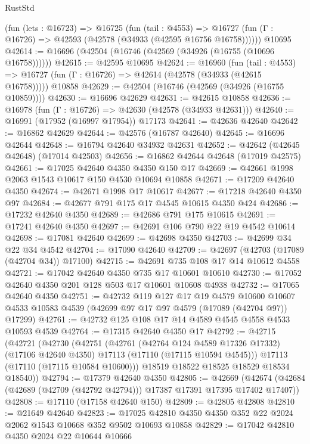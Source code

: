 \begin{lexlean}{RustStd}
\begin{coremodule}
    (fun (lets : @16723) =>
    @16725
      (fun (tail : @4553) =>
      @16727 (fun (Γ : @16726) => @42593 (@42578 (@34933 (@42595 @16756 @16758))))))
    @10695
@42614 := @16696 (@42504 (@16746 (@42569 (@34926 (@16755 (@10696 @16758))))))
@42615 := @42595 @10695
@42624 := @16960
    (fun (tail : @4553) => @16727 (fun (Γ : @16726) => @42614 (@42578 (@34933 (@42615 @16758)))))
    @10858
@42629 := @42504 (@16746 (@42569 (@34926 (@16755 @10859))))
@42630 := @16696 @42629
@42631 := @42615 @10858
@42636 := @16978 (fun (Γ : @16726) => @42630 (@42578 (@34933 @42631)))
@42640 := @16991 (@17952 (@16997 @17954)) @17173
@42641 := @42636 @42640
@42642 := @16862 @42629
@42644 := @42576 (@16787 @42640)
@42645 := @16696 @42644
@42648 := @16794 @42640 @34932 @42631
@42652 := @42642 (@42645 @42648) (@17014 @42503)
@42656 := @16862 @42644 @42648 (@17019 @42575)
@42661 := @17025 @42640 @4350 @4350 @150 @17
@42669 := @42661 @1998 @2063 @1543 @10617 @150 @4530 @10694 @10858
@42671 := @17209 @42640 @4350
@42674 := @42671 @1998 @17 @10617
@42677 := @17218 @42640 @4350 @97
@42684 := @42677 @791 @175 @17 @4545 @10615 @4350 @424
@42686 := @17232 @42640 @4350
@42689 := @42686 @791 @175 @10615
@42691 := @17241 @42640 @4350
@42697 := @42691 @106 @790 @22 @19 @4542 @10614
@42698 := @17081 @42640
@42699 := @42698 @4350
@42703 := @42699 @34 @22 @34 @4542
@42704 := @17090 @42640
@42709 := @42697 (@42703 (@17089 (@42704 @34)) @17100)
@42715 := @42691 @735 @108 @17 @14 @10612 @4558
@42721 := @17042 @42640 @4350 @735 @17 @10601 @10610
@42730 := @17052 @42640 @4350 @201 @128 @503 @17 @10601 @10608 @4938
@42732 := @17065 @42640 @4350
@42751 := @42732
    @119
    @127
    @17
    @19
    @4579
    @10600
    @10607
    @4533
    @10583
    @4539
    (@42699 @97 @17 @97 @4579 (@17089 (@42704 @97)) @17299)
@42761 := @42732 @125 @108 @17 @14 @4589 @4545 @4558 @4533 @10593 @4539
@42764 := @17315 @42640 @4350 @17
@42792 := @42715
    (@42721
      (@42730
        (@42751
          (@42761
            (@42764 @124 @4589 @17326 @17332)
            (@17106 @42640 @4350)
            @17113
            (@17110 (@17115 @10594 @4545)))
          @17113
          (@17110 (@17115 @10584 @10600)))
        @18519
        @18522
        @18525
        @18529
        @18534
        @18540))
@42794 := @17379 @42640 @4350
@42805 := @42669
    (@42674 (@42684 (@42689 (@42709 (@42792 @42794))) @17387 @17391 @17395 @17402 @17407))
@42808 := @17110 (@17158 @42640 @150)
@42809 := @42805 @42808
@42810 := @21649 @42640
@42823 := @17025 @42810 @4350 @4350 @352 @22 @2024 @2062 @1543 @10668 @352 @9502 @10693 @10858
@42829 := @17042 @42810 @4350 @2024 @22 @10644 @10666

\end{coremodule}
\end{lexlean}
